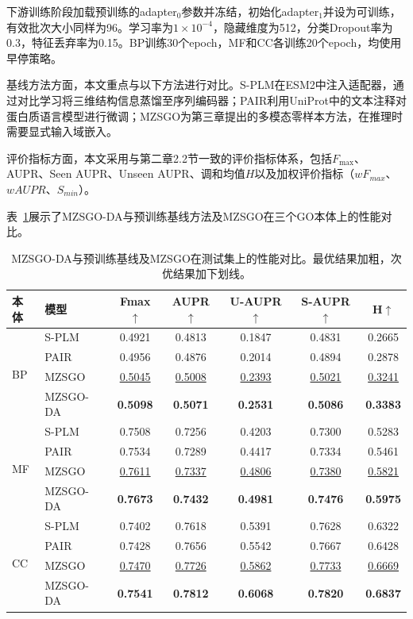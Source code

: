 下游训练阶段加载预训练的adapter$_0$参数并冻结，初始化adapter$_1$并设为可训练，有效批次大小同样为96。学习率为$1\times10^{-4}$，隐藏维度为512，分类Dropout率为0.3，特征丢弃率为0.15。BP训练30个epoch，MF和CC各训练20个epoch，均使用早停策略。

基线方法方面，本文重点与以下方法进行对比。S-PLM\cite{wang2025splm}在ESM2中注入适配器，通过对比学习将三维结构信息蒸馏至序列编码器；PAIR\cite{duan2025pair}利用UniProt中的文本注释对蛋白质语言模型进行微调；MZSGO为第三章提出的多模态零样本方法，在推理时需要显式输入域嵌入。

评价指标方面，本文采用与第二章2.2节一致的评价指标体系，包括$F_{\max}$、AUPR、Seen AUPR、Unseen AUPR、调和均值$H$以及加权评价指标（$wF_{max}$、$wAUPR$、$S_{min}$）。

表~\ref{tab:mzsgo_da_comparison}展示了MZSGO-DA与预训练基线方法及MZSGO在三个GO本体上的性能对比。

\begin{table}[htbp]
\centering
\caption{MZSGO-DA与预训练基线及MZSGO在测试集上的性能对比。最优结果加粗，次优结果加下划线。}
\label{tab:mzsgo_da_comparison}
\small
\begin{tabular}{llccccc}
\toprule
本体 & 模型 & Fmax$\uparrow$ & AUPR$\uparrow$ & U-AUPR$\uparrow$ & S-AUPR$\uparrow$ & H$\uparrow$ \\
\midrule
\multirow{4}{*}{BP}
 & S-PLM & 0.4921 & 0.4813 & 0.1847 & 0.4831 & 0.2665 \\
 & PAIR & 0.4956 & 0.4876 & 0.2014 & 0.4894 & 0.2878 \\
 & MZSGO & \underline{0.5045} & \underline{0.5008} & \underline{0.2393} & \underline{0.5021} & \underline{0.3241} \\
 & MZSGO-DA & \textbf{0.5098} & \textbf{0.5071} & \textbf{0.2531} & \textbf{0.5086} & \textbf{0.3383} \\
\midrule
\multirow{4}{*}{MF}
 & S-PLM & 0.7508 & 0.7256 & 0.4203 & 0.7300 & 0.5283 \\
 & PAIR & 0.7534 & 0.7289 & 0.4417 & 0.7334 & 0.5461 \\
 & MZSGO & \underline{0.7611} & \underline{0.7337} & \underline{0.4806} & \underline{0.7380} & \underline{0.5821} \\
 & MZSGO-DA & \textbf{0.7673} & \textbf{0.7432} & \textbf{0.4981} & \textbf{0.7476} & \textbf{0.5975} \\
\midrule
\multirow{4}{*}{CC}
 & S-PLM & 0.7402 & 0.7618 & 0.5391 & 0.7628 & 0.6322 \\
 & PAIR & 0.7428 & 0.7656 & 0.5542 & 0.7667 & 0.6428 \\
 & MZSGO & \underline{0.7470} & \underline{0.7726} & \underline{0.5862} & \underline{0.7733} & \underline{0.6669} \\
 & MZSGO-DA & \textbf{0.7541} & \textbf{0.7812} & \textbf{0.6068} & \textbf{0.7820} & \textbf{0.6837} \\
\bottomrule
\end{tabular}
\end{table}

